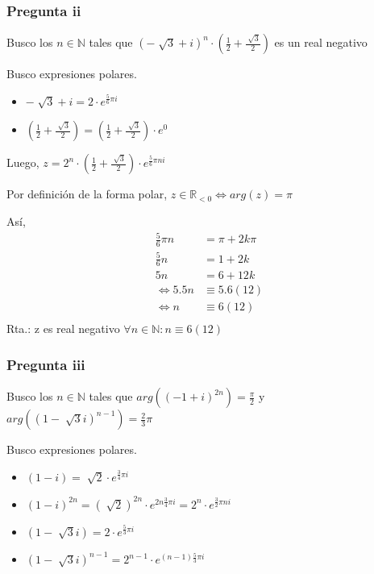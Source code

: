 \subsubsection{Pregunta ii}

Busco los $ n \in \mathbb{N} $ tales que $ (-\sqrt[]{3}+i)^n \cdot \left(\frac{1}{2} + \frac{\sqrt[]{3}}{2}\right) $ es un real negativo

Busco expresiones polares.

\begin{itemize}
    \item $ -\sqrt[]{3}+i = 2\cdot e^{\frac{5}{6} \pi i} $
    \item $ \left(\frac{1}{2} + \frac{\sqrt[]{3}}{2}\right) = \left(\frac{1}{2} + \frac{\sqrt[]{3}}{2}\right) \cdot e^0 $
\end{itemize}

Luego,
$ z = 2^n \cdot \left(\frac{1}{2} + \frac{\sqrt[]{3}}{2}\right) \cdot e^{\frac{5}{6} \pi n i} $

Por definición de la forma polar, $ z \in \mathbb{R}_{<0} \iff arg(z) = \pi $

Así,
\begin{align*}
    \frac{5}{6} \pi n &= \pi + 2k \pi \\ 
    \frac{5}{6} n &= 1 + 2k \\ 
    5 n &= 6 + 12k \\ 
    \iff 5.5 n &\equiv 5.6(12) \\ 
    \iff n &\equiv 6(12) \\ 
\end{align*}
Rta.: z es real negativo $ \forall n \in \mathbb{N}: n \equiv 6(12) $

\subsubsection{Pregunta iii}

Busco los $ n \in \mathbb{N} $ tales que $ arg((-1+i)^{2n}) = \frac{\pi}{2} $ y $ arg((1-\sqrt[]{3}i)^{n-1}) = \frac{2}{3}\pi $

Busco expresiones polares.

\begin{itemize}
    \item $ (1-i) = \sqrt[]{2} \cdot e^{\frac{3}{4}\pi i}$
    \item $ (1-i)^{2n} = \left(\sqrt[]{2}\right)^{2n} \cdot e^{2n\frac{3}{4}\pi i} = 2^n \cdot e^{\frac{3}{2}\pi n i} $
    \item $ (1-\sqrt[]{3}i) = 2\cdot e^{\frac{5}{3}\pi i} $
    \item $ (1-\sqrt[]{3}i)^{n-1} = 2^{n-1}\cdot e^{(n-1)\frac{5}{3}\pi i} $
\end{itemize}

